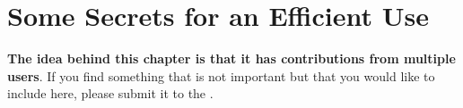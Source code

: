 
\renewcommand{\subsubsection} {\textsl{ }\\ }

\chapter{Some Secrets for an Efficient Use}

\textbf{The idea behind this chapter is that it has contributions from multiple users}.
If you find something that is not important but that you would like to include here,
please submit it to the .

\newpage

\newpage

\newpage

\newpage

\newpage

\newpage

\newpage

\newpage

\newpage

\newpage

\newpage

